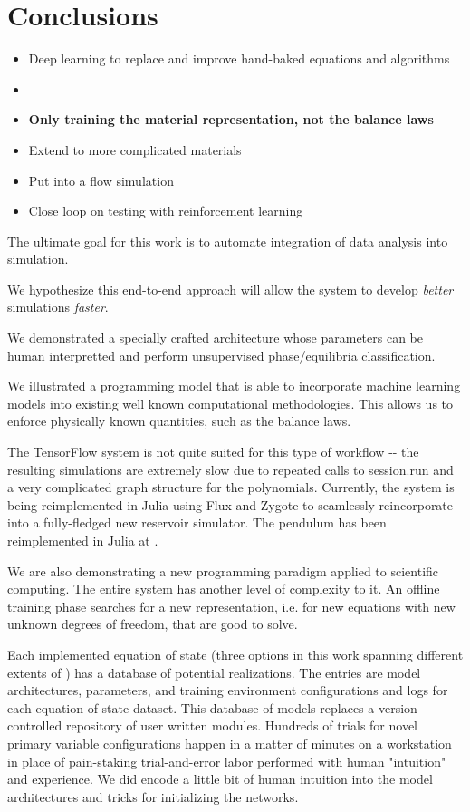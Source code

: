 \documentclass[]{article}
\begin{document}
\hypertarget{header-n3421}{%
\section{Conclusions}\label{header-n3421}}

\begin{itemize}
\item
  Deep learning to replace and improve hand-baked equations and
  algorithms
\item
\item
  \textbf{Only training the material representation, not the balance
  laws}
\item
  Extend to more complicated materials
\item
  Put into a flow simulation
\item
  Close loop on testing with reinforcement learning
\end{itemize}

The ultimate goal for this work is to automate integration of data
analysis into simulation.

We hypothesize this end-to-end approach will allow the system to develop
\emph{better} simulations \emph{faster}.

We demonstrated a specially crafted architecture whose parameters can be
human interpretted and perform unsupervised phase/equilibria
classification.

We illustrated a programming model that is able to incorporate machine
learning models into existing well known computational methodologies.
This allows us to enforce physically known quantities, such as the
balance laws.

The TensorFlow system is not quite suited for this type of workflow -\/-
the resulting simulations are extremely slow due to repeated calls to
session.run and a very complicated graph structure for the polynomials.
Currently, the system is being reimplemented in Julia using Flux and
Zygote to seamlessly reincorporate into a fully-fledged new reservoir
simulator. The pendulum has been reimplemented in Julia at .

We are also demonstrating a new programming paradigm applied to
scientific computing. The entire system has another level of complexity
to it. An offline training phase searches for a new representation, i.e.
for new equations with new unknown degrees of freedom, that are good to
solve.

Each implemented equation of state (three options in this work spanning
different extents of ) has a database of potential realizations.
The entries are model architectures, parameters, and training
environment configurations and logs for each equation-of-state dataset.
This database of models replaces a version controlled repository of user
written modules. Hundreds of trials for novel primary variable
configurations happen in a matter of minutes on a workstation in place
of pain-staking trial-and-error labor performed with human "intuition"
and experience. We did encode a little bit of human intuition into the
model architectures and tricks for initializing the networks.
\end{document}
